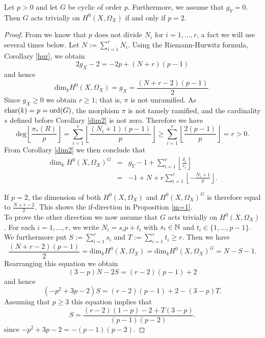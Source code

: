   \begin{prop}\label{m=1}
    Let $p  > 0$ and let $G$ be cyclic of order $p$.
    Furthermore, we assume that $g_Y=0$.
    Then $G$ acts trivially on $H^0(X,\Omega_X)$ if and only if $p=2$. 
  \end{prop}
  \begin{proof}
    From \cite[Lem 1, pg.87]{Naka} we know that $p$ does not divide $N_i$ for $i=1,\ldots ,r$, a fact we will use several times below. 
    Let $N:= \sum_{i=1}^r N_i$. 
    Using the Riemann-Hurwitz formula, Corollary \ref{hur}, we obtain
      \begin{equation}\label{hur2}
	2g_X - 2 = -2p + (N+r)(p-1)
      \end{equation}
    and hence
      \[
	\textrm{dim}_kH^0(X,\Omega_X) = g_X =\frac{(N+r-2)(p-1)}{2}.
      \] 
    Since $g_X \ge 0$ we obtain $r \ge 1$; that is, $\pi$ is not unramified. 
	As $\operatorname{char}(k) = p = \operatorname{ord}(G)$, the morphism $\pi$ is not tamely ramified, and the cardinality $s$ defined before Corollary \ref{dim2} is not zero.
    Therefore we have 
      \[
	\textrm{deg} \left\lfloor \frac{\pi_*(R)}{p} \right\rfloor =
	\sum_{i=1}^r \left\lfloor \frac{(N_i+1)(p-1)}{p}\right\rfloor 
	\ge \sum_{i=1}^r \left\lfloor \frac{2(p-1)}{p}\right\rfloor = r > 0.
      \] 
	From Corollary \ref{dim2} we then conclude that 
	\begin{eqnarray*}
		\dim_kH^0\left(X,\Omega_X\right)^G & = & g_Y - 1 + \sum_{i=1}^r\left\lfloor \frac{\delta_i}{e_i}\right\rfloor \\
		& = & -1 + N + r \sum_{i=1}^r\left\lfloor -\frac{N_i+1}{p}\right\rfloor.
	\end{eqnarray*}

    If $p=2$, the dimension of both $H^0(X,\Omega_X)$ and $H^0(X,\Omega_X)^G$ is therefore equal to $\frac{N+r-2}{2}$. 
    This shows the if-direction in Proposition \ref{m=1}.\\
    To prove the other direction we now assume that $G$ acts trivially on $H^0(X, \Omega_X)$.
    For each $i=1, \ldots, r$, we write $N_i = s_i p +t_i$ with $s_i \in {\mathbb N}$ and $t_i \in \{1, \ldots, p-1\}$. 
    We furthermore put $S:=\sum_{i=1}^r s_i$ and $T:= \sum_{i=1}^r t_i \ge r$. 
    Then we have
      \[ 
	 \frac{(N+r-2)(p-1)}{2} =\textrm{dim}_kH^0(X,\Omega_X)  = \textrm{dim}_k H^0(X,\Omega_X)^G = N-S-1 .
      \]
    Rearranging this equation we obtain
      \[
	 (3-p)N - 2S = (r-2)(p-1) +2  
      \]
    and hence
      \[
	 (-p^2 + 3p -2)S = (r-2)(p-1) +2 - (3-p)T.
      \]
    Assuming that $p \ge 3$ this equation implies that
      \[ 
	S = \frac{(r-2)(1-p)-2 + T (3-p)}{(p-1)(p-2)}. 
      \]
	since $-p^2+3p-2 = - (p-1)(p-2)$. 


\end{proof}
